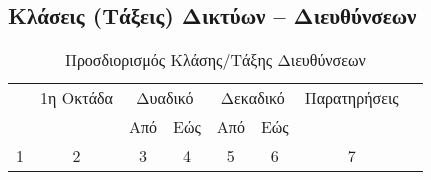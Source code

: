 %
%
\subsection{Κλάσεις (Τάξεις) Δικτύων -- Διευθύνσεων}

\begin{table}
\centering
  \begin{tabular}{|c|c|c|c|c|c|c|c|}
    \hline
    \multirow{2}{*}{} Τάξη & 1η Οκτάδα & \multicolumn{2}{|c|}{Δυαδικό} & \multicolumn{2}{|c|}{Δεκαδικό} & Παρατηρήσεις \\
    \cline{3-6}
    & & Από & Εώς & Από & Εώς & \\
    \hline
    1&2&3&4&5&6&7 \\
    \hline
  \end{tabular}
  
\caption{Προσδιορισμός Κλάσης/Τάξης Διευθύνσεων}
\label{t3-1-2}
\end{table}
